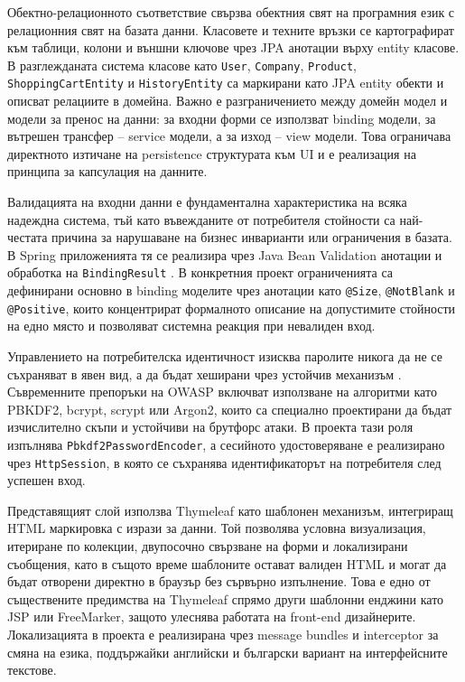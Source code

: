 Обектно-релационното съответствие \cite{springdatajpa} свързва обектния свят на програмния език с релационния свят на базата данни. Класовете и техните връзки се картографират към таблици, колони и външни ключове чрез JPA анотации върху entity класове. В разглежданата система класове като \texttt{User}, \texttt{Company}, \texttt{Product}, \texttt{ShoppingCartEntity} и \texttt{HistoryEntity} са маркирани като JPA entity обекти и описват релациите в домейна. Важно е разграничението между домейн модел и модели за пренос на данни: за входни форми се използват binding модели, за вътрешен трансфер -- service модели, а за изход -- view модели. Това ограничава директното изтичане на persistence структурата към UI и е реализация на принципа за капсулация на данните.

Валидацията на входни данни е фундаментална характеристика на всяка надеждна система, тъй като въвежданите от потребителя стойности са най-честата причина за нарушаване на бизнес инварианти или ограничения в базата. В Spring приложенията тя се реализира чрез Java Bean Validation анотации и обработка на \texttt{BindingResult} \cite{hibernatevalidator}. В конкретния проект ограниченията са дефинирани основно в binding моделите чрез анотации като \texttt{@Size}, \texttt{@NotBlank} и \texttt{@Positive}, които концентрират формалното описание на допустимите стойности на едно място и позволяват системна реакция при невалиден вход.

Управлението на потребителска идентичност изисква паролите никога да не се съхраняват в явен вид, а да бъдат хеширани чрез устойчив механизъм \cite{springsecuritycrypto,owasp}. Съвременните препоръки на OWASP включват използване на алгоритми като PBKDF2, bcrypt, scrypt или Argon2, които са специално проектирани да бъдат изчислително скъпи и устойчиви на брутфорс атаки. В проекта тази роля изпълнява \texttt{Pbkdf2PasswordEncoder}, а сесийното удостоверяване е реализирано чрез \texttt{HttpSession}, в която се съхранява идентификаторът на потребителя след успешен вход.

Представящият слой използва Thymeleaf \cite{thymeleaf} като шаблонен механизъм, интегриращ HTML маркировка с изрази за данни. Той позволява условна визуализация, итериране по колекции, двупосочно свързване на форми и локализирани съобщения, като в същото време шаблоните остават валиден HTML и могат да бъдат отворени директно в браузър без сървърно изпълнение. Това е едно от съществените предимства на Thymeleaf спрямо други шаблонни енджини като JSP или FreeMarker, защото улеснява работата на front-end дизайнерите. Локализацията в проекта е реализирана чрез message bundles и interceptor за смяна на езика, поддържайки английски и български вариант на интерфейсните текстове.

